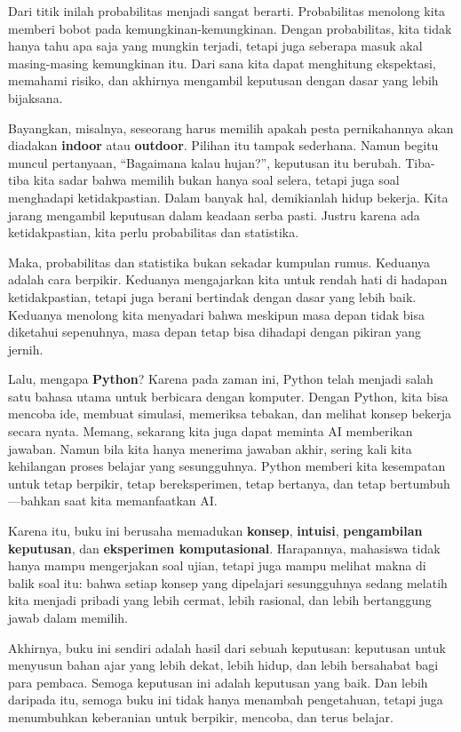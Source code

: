 \documentclass[
  letterpaper,
  DIV=11,
  numbers=noendperiod]{scrreprt}
\begin{document}
Dari titik inilah probabilitas menjadi sangat berarti. Probabilitas
menolong kita memberi bobot pada kemungkinan-kemungkinan. Dengan
probabilitas, kita tidak hanya tahu apa saja yang mungkin terjadi,
tetapi juga seberapa masuk akal masing-masing kemungkinan itu. Dari sana
kita dapat menghitung ekspektasi, memahami risiko, dan akhirnya
mengambil keputusan dengan dasar yang lebih bijaksana.

Bayangkan, misalnya, seseorang harus memilih apakah pesta pernikahannya
akan diadakan \textbf{indoor} atau \textbf{outdoor}. Pilihan itu tampak
sederhana. Namun begitu muncul pertanyaan, ``Bagaimana kalau hujan?'',
keputusan itu berubah. Tiba-tiba kita sadar bahwa memilih bukan hanya
soal selera, tetapi juga soal menghadapi ketidakpastian. Dalam banyak
hal, demikianlah hidup bekerja. Kita jarang mengambil keputusan dalam
keadaan serba pasti. Justru karena ada ketidakpastian, kita perlu
probabilitas dan statistika.

Maka, probabilitas dan statistika bukan sekadar kumpulan rumus. Keduanya
adalah cara berpikir. Keduanya mengajarkan kita untuk rendah hati di
hadapan ketidakpastian, tetapi juga berani bertindak dengan dasar yang
lebih baik. Keduanya menolong kita menyadari bahwa meskipun masa depan
tidak bisa diketahui sepenuhnya, masa depan tetap bisa dihadapi dengan
pikiran yang jernih.

Lalu, mengapa \textbf{Python}? Karena pada zaman ini, Python telah
menjadi salah satu bahasa utama untuk berbicara dengan komputer. Dengan
Python, kita bisa mencoba ide, membuat simulasi, memeriksa tebakan, dan
melihat konsep bekerja secara nyata. Memang, sekarang kita juga dapat
meminta AI memberikan jawaban. Namun bila kita hanya menerima jawaban
akhir, sering kali kita kehilangan proses belajar yang sesungguhnya.
Python memberi kita kesempatan untuk tetap berpikir, tetap
bereksperimen, tetap bertanya, dan tetap bertumbuh---bahkan saat kita
memanfaatkan AI.

Karena itu, buku ini berusaha memadukan \textbf{konsep},
\textbf{intuisi}, \textbf{pengambilan keputusan}, dan \textbf{eksperimen
komputasional}. Harapannya, mahasiswa tidak hanya mampu mengerjakan soal
ujian, tetapi juga mampu melihat makna di balik soal itu: bahwa setiap
konsep yang dipelajari sesungguhnya sedang melatih kita menjadi pribadi
yang lebih cermat, lebih rasional, dan lebih bertanggung jawab dalam
memilih.

Akhirnya, buku ini sendiri adalah hasil dari sebuah keputusan: keputusan
untuk menyusun bahan ajar yang lebih dekat, lebih hidup, dan lebih
bersahabat bagi para pembaca. Semoga keputusan ini adalah keputusan yang
baik. Dan lebih daripada itu, semoga buku ini tidak hanya menambah
pengetahuan, tetapi juga menumbuhkan keberanian untuk berpikir, mencoba,
dan terus belajar.
\end{document}
